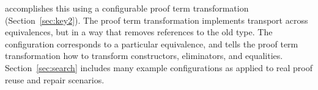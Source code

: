 \toolname accomplishes this using a configurable proof term transformation (Section~\ref{sec:key2}).
The proof term transformation implements transport across equivalences, but in a way that removes
references to the old type.
The configuration corresponds to a particular equivalence, and tells the proof term transformation how to transform
constructors, eliminators, and equalities.
Section~\ref{sec:search} includes many example configurations as applied to real proof reuse and repair scenarios.


